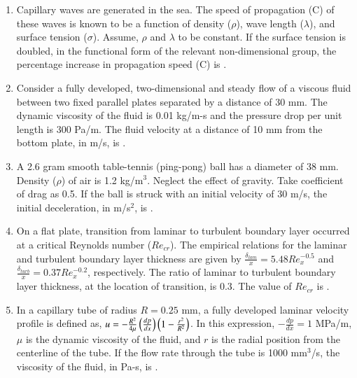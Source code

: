 \documentclass[a4paper,10pt]{article}
\begin{document}
\begin{enumerate}
    \item Capillary waves are generated in the sea. The speed of propagation (C) of these waves is known to be a function of density ($\rho$), wave length ($\lambda$), and surface tension ($\sigma$). Assume, $\rho$ and $\lambda$ to be constant. If the surface tension is doubled, in the functional form of the relevant non-dimensional group, the percentage increase in propagation speed (C) is \underline{\hspace{2cm}}.
    \hfill{}

    \item Consider a fully developed, two-dimensional and steady flow of a viscous fluid between two fixed parallel plates separated by a distance of 30 mm. The dynamic viscosity of the fluid is 0.01 kg/m-s and the pressure drop per unit length is 300 Pa/m. The fluid velocity at a distance of 10 mm from the bottom plate, in m/s, is \underline{\hspace{2cm}}.
    \hfill{}

    \item A 2.6 gram smooth table-tennis (ping-pong) ball has a diameter of 38 mm. Density ($\rho$) of air is 1.2 kg/m$^3$. Neglect the effect of gravity. Take coefficient of drag as 0.5. If the ball is struck with an initial velocity of 30 m/s, the initial deceleration, in m/s$^2$, is \underline{\hspace{2cm}}.
    \hfill{}

    \item On a flat plate, transition from laminar to turbulent boundary layer occurred at a critical Reynolds number ($Re_{cr}$). The empirical relations for the laminar and turbulent boundary layer thickness are given by $\frac{\delta_{lam}}{x} = 5.48 Re_x^{-0.5}$ and $\frac{\delta_{turb}}{x} = 0.37 Re_x^{-0.2}$, respectively. The ratio of laminar to turbulent boundary layer thickness, at the location of transition, is 0.3. The value of $Re_{cr}$ is \underline{\hspace{2cm}}.
    \hfill{}

    \item In a capillary tube of radius $R = 0.25$ mm, a fully developed laminar velocity profile is defined as, $u = -\frac{R^2}{4\mu}\left(\frac{dp}{dx}\right)\left(1-\frac{r^2}{R^2}\right)$. In this expression, $-\frac{dp}{dx} = 1$ MPa/m, $\mu$ is the dynamic viscosity of the fluid, and $r$ is the radial position from the centerline of the tube. If the flow rate through the tube is 1000 mm$^3$/s, the viscosity of the fluid, in Pa-s, is \underline{\hspace{2cm}}.
    \hfill{}


\end{enumerate}
\end{document}
